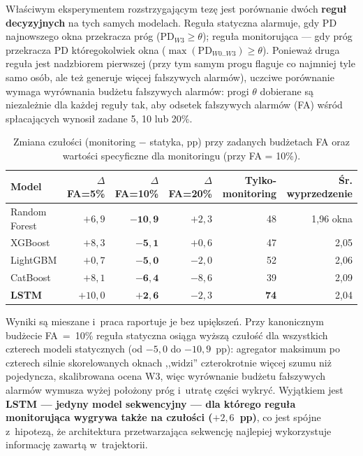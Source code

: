 Właściwym eksperymentem rozstrzygającym tezę jest porównanie dwóch
\textbf{reguł decyzyjnych} na tych samych modelach. Reguła statyczna alarmuje,
gdy PD najnowszego okna przekracza próg ($\mathrm{PD}_{W3} \geq \theta$);
reguła monitorująca --- gdy próg przekracza PD któregokolwiek okna
($\max(\mathrm{PD}_{W0..W3}) \geq \theta$). Ponieważ druga reguła jest
nadzbiorem pierwszej (przy tym samym progu flaguje co najmniej tyle samo osób,
ale też generuje więcej fałszywych alarmów), uczciwe porównanie wymaga
wyrównania budżetu fałszywych alarmów: progi $\theta$ dobierane są niezależnie
dla każdej reguły tak, aby odsetek fałszywych alarmów (FA) wśród spłacających
wynosił zadane 5, 10 lub 20\%.

\begin{table}[htbp]
\centering
\caption{Zmiana czułości (monitoring $-$ statyka, pp) przy zadanych budżetach FA
oraz wartości specyficzne dla monitoringu (przy FA = 10\%).}
\label{tab:staticdyn}
\begin{tabular}{lrrrrr}
\toprule
Model & $\Delta$ FA=5\% & $\Delta$ FA=10\% & $\Delta$ FA=20\% & Tylko-monitoring & Śr. wyprzedzenie \\
\midrule
Random Forest & $+6{,}9$ & $\mathbf{-10{,}9}$ & $+2{,}3$ & 48 & 1,96 okna \\
XGBoost       & $+8{,}3$ & $\mathbf{-5{,}1}$  & $+0{,}6$ & 47 & 2,05 \\
LightGBM      & $+0{,}7$ & $\mathbf{-5{,}0}$  & $-2{,}0$ & 52 & 2,06 \\
CatBoost      & $+8{,}1$ & $\mathbf{-6{,}4}$  & $-8{,}6$ & 39 & 2,09 \\
\textbf{LSTM} & $+10{,}0$ & $\mathbf{+2{,}6}$ & $-2{,}3$ & \textbf{74} & 2,04 \\
\bottomrule
\end{tabular}
\end{table}

Wyniki są mieszane i~praca raportuje je bez upiększeń. Przy kanonicznym
budżecie FA~=~10\% reguła statyczna osiąga wyższą czułość dla wszystkich
czterech modeli statycznych (od $-5{,}0$ do $-10{,}9$~pp): agregator maksimum
po czterech silnie skorelowanych oknach ,,widzi'' czterokrotnie więcej szumu
niż pojedyncza, skalibrowana ocena W3, więc wyrównanie budżetu fałszywych
alarmów wymusza wyżej położony próg i~utratę części wykryć. Wyjątkiem jest
\textbf{LSTM --- jedyny model sekwencyjny --- dla którego reguła monitorująca
wygrywa także na czułości ($+2{,}6$~pp)}, co jest spójne z~hipotezą, że
architektura przetwarzająca sekwencję najlepiej wykorzystuje informację zawartą
w~trajektorii.

